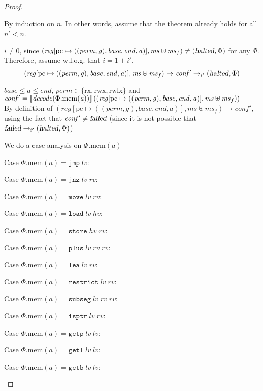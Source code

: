 \documentclass[a4paper]{article}
\newcommand{\update}[2]{[#1 \mapsto #2]}
\newcommand{\sem}[1]{\left\llbracket #1 \right\rrbracket}
\newcommand{\var}[1]{\mathit{#1}}
\newcommand{\hs}{\var{ms}}
\newcommand{\ms}{\hs}
\newcommand{\hv}{\var{hv}}
\newcommand{\rv}{\var{rv}}
\newcommand{\lv}{\var{lv}}
\newcommand{\gl}{\var{g}}
\newcommand{\pcreg}{\mathrm{pc}}
\newcommand{\addr}{\var{a}}
\newcommand{\start}{\var{base}}
\newcommand{\addrend}{\var{end}}
\newcommand{\reg}{\var{reg}}
\newcommand{\perm}{\var{perm}}
\newcommand{\plainproj}[1]{\mathrm{#1}}
\newcommand{\memheap}[1][\Phi]{#1.\plainproj{mem}}
\newcommand{\failed}{\textsl{failed}}
\newcommand{\halted}{\textsl{halted}}
\newcommand{\plainfun}[2]{
  \ifthenelse{\equal{#2}{}}
  {\mathit{#1}}
  {\mathit{#1}(#2)}
}
\newcommand{\decode}{\plainfun{decode}{}}
\newcommand{\zinstr}[1]{\mathtt{#1}}
\newcommand{\oneinstr}[2]{\zinstr{#1} \; #2}
\newcommand{\jmp}[1]{\oneinstr{jmp}{#1}}
\newcommand{\twoinstr}[3]{\zinstr{#1} \; #2 \; #3}
\newcommand{\restricttwo}[2]{\twoinstr{restrict}{#1}{#2}}
\newcommand{\jnz}[2]{\twoinstr{jnz}{#1}{#2}}
\newcommand{\isptr}[2]{\twoinstr{isptr}{#1}{#2}}
\newcommand{\getb}[2]{\twoinstr{getb}{#1}{#2}}
\newcommand{\getp}[2]{\twoinstr{getp}{#1}{#2}}
\newcommand{\getl}[2]{\twoinstr{getl}{#1}{#2}}
\newcommand{\move}[2]{\twoinstr{move}{#1}{#2}}
\newcommand{\store}[2]{\twoinstr{store}{#1}{#2}}
\newcommand{\load}[2]{\twoinstr{load}{#1}{#2}}
\newcommand{\lea}[2]{\twoinstr{lea}{#1}{#2}}
\newcommand{\threeinstr}[4]{\zinstr{#1} \; #2 \; #3 \; #4}
\newcommand{\subseg}[3]{\threeinstr{subseg}{#1}{#2}{#3}}
\newcommand{\plus}[3]{\threeinstr{plus}{#1}{#2}{#3}}
\newcommand{\plainperm}[1]{\mathrm{#1}}
\newcommand{\exec}{\plainperm{rx}}
\newcommand{\rwx}{\plainperm{rwx}}
\newcommand{\rwlx}{\plainperm{rwlx}}
\newcommand{\step}[1][]{\rightarrow_{#1}}
\begin{document}
\begin{proof}
  \begin{enumproof}
  \item By induction on $n$. In other words, assume that the theorem already
    holds for all $n' < n$.
  \item $i \neq 0$, since
    $(\reg\update{\pcreg}{((\perm,\gl),\start,\addrend,\addr)},\hs \uplus
    \ms_f)\neq (\halted,\Phi)$ for any $\Phi$. \\
    Therefore, assume w.l.o.g. that $i = 1+i'$,
    \begin{equation*}
      (\reg\update{\pcreg}{((\perm,\gl),\start,\addrend,\addr)},\hs \uplus \ms_f) \step \var{conf'} \step[i'] (\halted,\Phi)
    \end{equation*}
  \item $\start \leq \addr \leq \addrend$, $\perm \in \{ \exec,\rwx, \rwlx \}$
    and $\var{conf'} =
    \sem{\decode(\memheap(\addr))}((\reg\update{\pcreg}{((\perm,\gl),\start,\addrend,\addr)},\hs
    \uplus \ms_f))$\\
    By definition of
    $(\reg\update{\pcreg}{((\perm,\gl),\start,\addrend,\addr)},\hs \uplus \ms_f)
    \step \var{conf'}$, using the fact that $\var{conf'} \neq \failed$ (since it
    is not possible that $\failed \step[i'] (\halted,\Phi)$)
  \item We do a case analysis on
    $\memheap(a)$
    \begin{enumproof}
    \item Case $\memheap(a) = \jmp{\lv}$:
    \item Case $\memheap(a) = \jnz{\lv}{\rv}$:
    \item Case $\memheap(a) = \move{\lv}{\rv}$:
    \item Case $\memheap(a) = \load{\lv}{\hv}$:
    \item Case $\memheap(a) = \store{\hv}{\rv}$:
    \item Case $\memheap(a) = \plus{\lv}{\rv}{\rv}$:
    \item Case $\memheap(a) = \lea{\lv}{\rv}$:
    \item Case $\memheap(a) = \restricttwo{\lv}{\rv}$:
    \item Case $\memheap(a) = \subseg{\lv}{\rv}{\rv}$:
    \item Case $\memheap(a) = \isptr{\lv}{\rv}$:
    \item Case $\memheap(a) = \getp{\lv}{\lv}$:
    \item Case $\memheap(a) = \getl{\lv}{\lv}$:
    \item Case $\memheap(a) = \getb{\lv}{\lv}$:

\end{enumproof}
\end{enumproof}
\end{proof}
\end{document}
